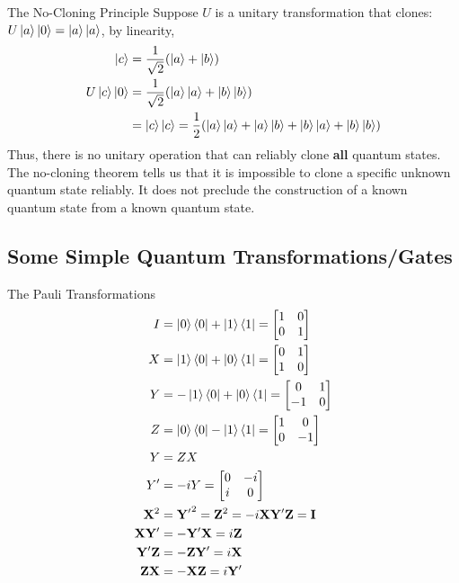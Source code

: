 \documentclass{beamer}
\begin{document}
\begin{frame}{The No-Cloning Principle}
  {\tiny
    Suppose $U$ is a unitary transformation that clones: $U\ket{a}\ket{0} = \ket{a}\ket{a}$, by linearity,
    \begin{align*}
      \ket{c} &= \frac{1}{\sqrt2} (\ket{a} + \ket{b}) \\
      U\ket{c}\ket{0} &=  \frac{1}{\sqrt2} ( \ket{a}\ket{a} + \ket{b}\ket{b} ) \\
                      &=  \ket{c}\ket{c} = \frac{1}{2} (  \ket{a}\ket{a} + \ket{a}\ket{b} + \ket{b}\ket{a} + \ket{b}\ket{b} )
    \end{align*}
    Thus, there is no unitary operation that can reliably clone \textbf{all} quantum states.
    The no-cloning theorem tells us that it is impossible to clone a specific unknown quantum state reliably.
    It does not preclude the construction of a known quantum state from a known quantum state.
  }%
\end{frame}

\subsection{Some Simple Quantum Transformations/Gates}

\begin{frame}{The Pauli Transformations}
  {\tiny
    \begin{align*}
      I &= \ket0\bra0 + \ket1\bra1 = \begin{bmatrix} 1 & 0 \\ 0 & 1 \end{bmatrix} \\
      X &= \ket1\bra0 + \ket0\bra1 = \begin{bmatrix} 0 & 1 \\ 1 & 0 \end{bmatrix} \\
      Y &= -\ket1\bra0 + \ket0\bra1 = \begin{bmatrix} 0 & 1 \\ -1 & 0 \end{bmatrix} \\
      Z &= \ket0\bra0 - \ket1\bra1 = \begin{bmatrix} 1 & 0 \\ 0 & -1 \end{bmatrix} \\
      Y &= ZX \\
      Y' &= -iY = \begin{bmatrix} 0 & -i \\ i & 0 \end{bmatrix} \\
      \mathbf{X}^2 &= \mathbf{Y'}^2 = \mathbf{Z}^2 = -i\mathbf{XY'Z} = \mathbf{I} \\
      \mathbf{XY'} &= -\mathbf{Y'X} = i\mathbf{Z} \\
      \mathbf{Y'Z} &= -\mathbf{ZY'} = i\mathbf{X} \\
      \mathbf{ZX} &= -\mathbf{XZ} = i\mathbf{Y'}
    \end{align*}
  }%
\end{frame}
\end{document}
